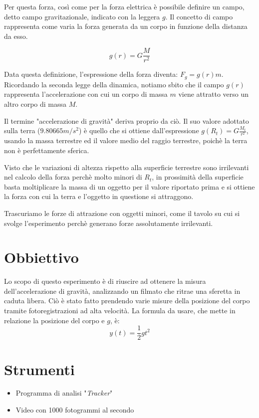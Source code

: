 \documentclass[12pt, a4paper]{article}
\begin{document}
Per questa forza, così come per la forza elettrica è possibile definire un campo, detto campo gravitazionale, indicato con la leggera $g$. 
Il concetto di campo rappresenta come varia la forza generata da un corpo in funzione della distanza da esso. 

\begin{equation}
    g(r) = G\frac{M}{r^2}
\end{equation}

Data questa definizione, l'espressione della forza diventa: $F_g = g(r) m$. 
Ricordando la seconda legge della dinamica, notiamo sbito che il campo $g(r)$ rappresenta l'accelerazione con cui un corpo di massa $m$ viene attratto verso un altro corpo di massa $M$. 

Il termine "accelerazione di gravità" deriva proprio da ciò. Il suo valore adottato sulla terra ($9.80665m/s^2$) è quello che si ottiene dall'espressione $g(R_t) = G\frac{M_t}{r^2}$, usando la massa terrestre ed il valore medio del raggio terrestre, poichè la terra non è perfettamente sferica. 

Visto che le variazioni di altezza rispetto alla superficie terrestre sono irrilevanti nel calcolo della forza perchè molto minori di $R_t$, in prossimità della superficie basta moltiplicare la massa di un oggetto per il valore riportato prima e si ottiene la forza con cui la terra e l'oggetto in questione si attraggono. 

Trascuriamo le forze di attrazione con oggetti minori, come il tavolo su cui si svolge l'esperimento perchè generano forze assolutamente irrilevanti.
\section{Obbiettivo}
\label{sezione obbiettivi}
Lo scopo di questo esperimento è di riuscire ad ottenere la misura dell'accelerazione di gravità, analizzando un filmato che ritrae una sferetta in caduta libera. 
Ciò è stato fatto prendendo varie misure della posizione del corpo tramite fotoregistrazioni ad alta velocità. 
La formula da usare, che mette in relazione la posizione del corpo e $g$, è:
\begin{equation*}
    y(t) = \frac{1}{2}gt^2
\end{equation*}


\section{Strumenti}
\begin{itemize}
\setlength\itemsep{0mm}
    \item Programma di analisi "\textit{Tracker}"
    \item Video con 1000 fotogrammi al secondo
\end{itemize}
\end{document}

